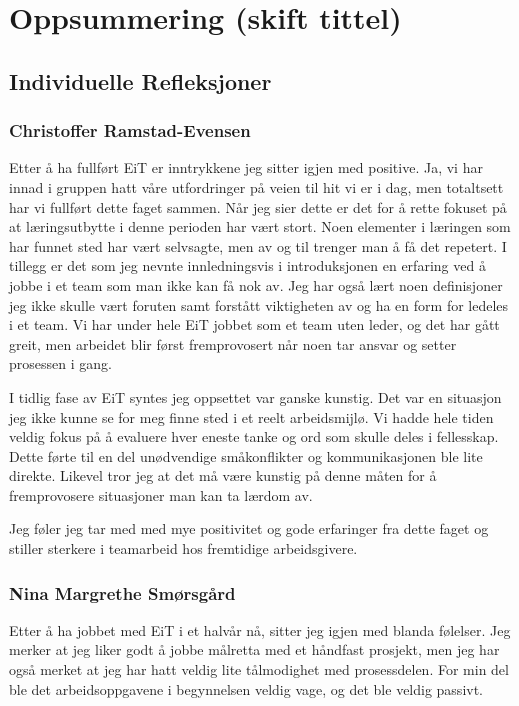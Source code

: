 \chapter{Oppsummering (skift tittel)}

\section{Individuelle Refleksjoner}

\subsection*{Christoffer Ramstad-Evensen}

Etter å ha fullført EiT er inntrykkene jeg sitter igjen med positive. Ja, vi har innad i gruppen hatt våre utfordringer
på veien til hit vi er i dag, men totaltsett har vi fullført dette faget sammen. Når jeg sier dette er det for å rette 
fokuset på at læringsutbytte i denne perioden har vært stort. Noen elementer i læringen som har funnet sted
har vært selvsagte, men av og til trenger man å få det repetert. I tillegg er det som jeg nevnte innledningsvis
i introduksjonen en erfaring ved å jobbe i et team som man ikke kan få nok av. Jeg har også lært noen 
definisjoner jeg ikke skulle vært foruten samt forstått viktigheten av og ha en form for ledeles i et team. 
Vi har under hele EiT jobbet som et team uten leder, og det har gått greit, men arbeidet blir først fremprovosert
når noen tar ansvar og setter prosessen i gang. 

I tidlig fase av EiT syntes jeg oppsettet var ganske kunstig. Det var en situasjon jeg ikke kunne se for meg
finne sted i et reelt arbeidsmijlø. Vi hadde hele tiden veldig fokus på å evaluere hver eneste tanke og ord som
skulle deles i fellesskap. Dette førte til en del unødvendige småkonflikter og kommunikasjonen ble lite direkte. 
Likevel tror jeg at det må være kunstig på denne måten for å fremprovosere situasjoner man kan ta lærdom av.

Jeg føler jeg tar med med mye positivitet og gode erfaringer fra dette faget og stiller sterkere i teamarbeid hos
fremtidige arbeidsgivere.

\subsection*{Nina Margrethe Smørsgård}
Etter å ha jobbet med EiT i et halvår nå, sitter jeg igjen med blanda følelser. 
Jeg merker at jeg liker godt å jobbe målretta med et håndfast prosjekt, men jeg 
har også merket at jeg har hatt veldig lite tålmodighet med prosessdelen. For 
min del ble det arbeidsoppgavene i begynnelsen veldig vage, og det ble veldig passivt.

